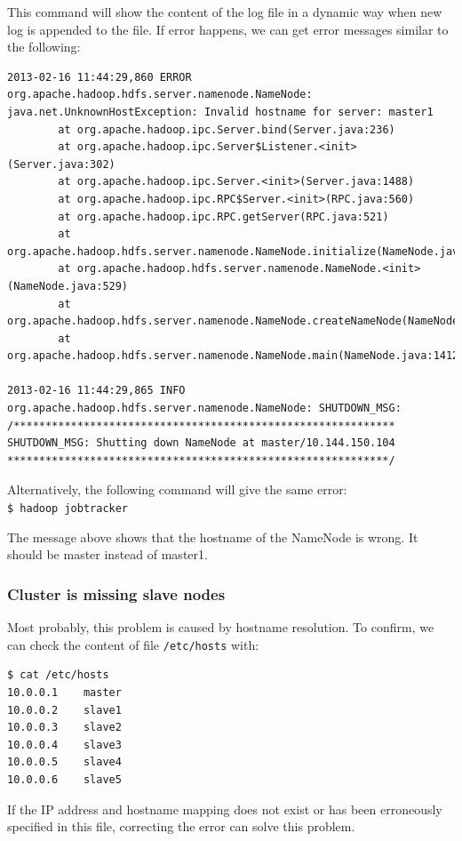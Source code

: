 This command will show the content of the log file in a dynamic way when new log is appended to the file. If error happens, we can get error messages similar to the following:
\lstset{style=bashstyle}
\begin{lstlisting}
2013-02-16 11:44:29,860 ERROR org.apache.hadoop.hdfs.server.namenode.NameNode: java.net.UnknownHostException: Invalid hostname for server: master1
        at org.apache.hadoop.ipc.Server.bind(Server.java:236)
        at org.apache.hadoop.ipc.Server$Listener.<init>(Server.java:302)
        at org.apache.hadoop.ipc.Server.<init>(Server.java:1488)
        at org.apache.hadoop.ipc.RPC$Server.<init>(RPC.java:560)
        at org.apache.hadoop.ipc.RPC.getServer(RPC.java:521)
        at org.apache.hadoop.hdfs.server.namenode.NameNode.initialize(NameNode.java:295)
        at org.apache.hadoop.hdfs.server.namenode.NameNode.<init>(NameNode.java:529)
        at org.apache.hadoop.hdfs.server.namenode.NameNode.createNameNode(NameNode.java:1403)
        at org.apache.hadoop.hdfs.server.namenode.NameNode.main(NameNode.java:1412)

2013-02-16 11:44:29,865 INFO org.apache.hadoop.hdfs.server.namenode.NameNode: SHUTDOWN_MSG:
/************************************************************
SHUTDOWN_MSG: Shutting down NameNode at master/10.144.150.104
************************************************************/
\end{lstlisting}

Alternatively, the following command will give the same error: \\
\verb|$ hadoop jobtracker|

The message above shows that the hostname of the NameNode is wrong. It should be master instead of master1.

\subsubsection*{Cluster is missing slave nodes}
Most probably, this problem is caused by hostname resolution. To confirm, we can check the content of file \verb|/etc/hosts| with:
\lstset{style=bashstyle}
\begin{lstlisting}
$ cat /etc/hosts
10.0.0.1	master
10.0.0.2	slave1
10.0.0.3	slave2
10.0.0.4	slave3
10.0.0.5	slave4
10.0.0.6	slave5
\end{lstlisting}

If the IP address and hostname mapping does not exist or has been erroneously specified in this file, correcting the error can solve this problem.

